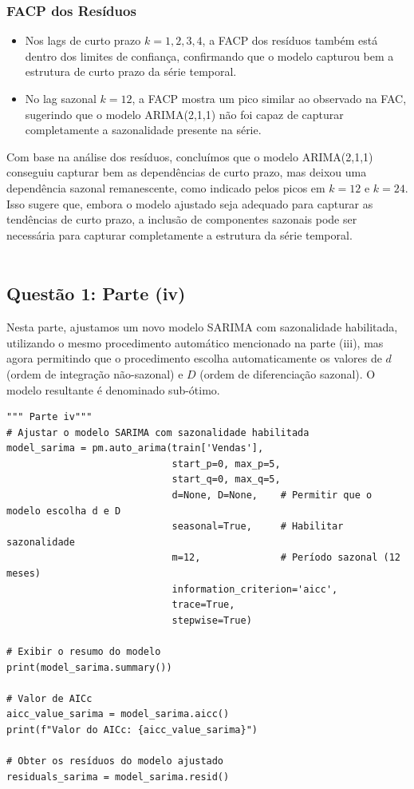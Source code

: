 \documentclass[a4paper, 12pt]{article}
\begin{document}
\subsubsection*{FACP dos Resíduos}
\begin{itemize}
    \item Nos lags de curto prazo \(k = 1, 2, 3, 4\), a FACP dos resíduos também está dentro dos limites de confiança, confirmando que o modelo capturou bem a estrutura de curto prazo da série temporal.
    \item No lag sazonal \(k = 12\), a FACP mostra um pico similar ao observado na FAC, sugerindo que o modelo ARIMA(2,1,1) não foi capaz de capturar completamente a sazonalidade presente na série.
\end{itemize}

Com base na análise dos resíduos, concluímos que o modelo ARIMA(2,1,1) conseguiu capturar bem as dependências de curto prazo, mas deixou uma dependência sazonal remanescente, como indicado pelos picos em \(k = 12\) e \(k = 24\). Isso sugere que, embora o modelo ajustado seja adequado para capturar as tendências de curto prazo, a inclusão de componentes sazonais pode ser necessária para capturar completamente a estrutura da série temporal.\\\\



\subsection{Questão 1: Parte (iv)}

Nesta parte, ajustamos um novo modelo SARIMA com sazonalidade habilitada, utilizando o mesmo procedimento automático mencionado na parte (iii), mas agora permitindo que o procedimento escolha automaticamente os valores de \(d\) (ordem de integração não-sazonal) e \(D\) (ordem de diferenciação sazonal). O modelo resultante é denominado sub-ótimo.\\

\begin{lstlisting}[style=python]
""" Parte iv"""
# Ajustar o modelo SARIMA com sazonalidade habilitada
model_sarima = pm.auto_arima(train['Vendas'],
                             start_p=0, max_p=5,
                             start_q=0, max_q=5,
                             d=None, D=None,    # Permitir que o modelo escolha d e D
                             seasonal=True,     # Habilitar sazonalidade
                             m=12,              # Período sazonal (12 meses)
                             information_criterion='aicc',
                             trace=True,
                             stepwise=True)

# Exibir o resumo do modelo
print(model_sarima.summary())

# Valor de AICc
aicc_value_sarima = model_sarima.aicc()
print(f"Valor do AICc: {aicc_value_sarima}")

# Obter os resíduos do modelo ajustado
residuals_sarima = model_sarima.resid()
\end{lstlisting} \\
\end{document}
